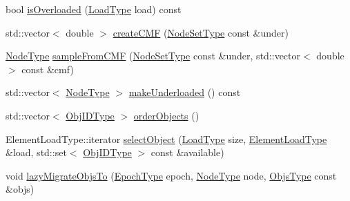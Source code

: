 \begin{DoxyCompactItemize}
\item 
bool \hyperlink{structvt_1_1vrt_1_1collection_1_1lb_1_1_gossip_l_b_a8bbe18748b6dd4b5269e6abfed5c6f99}{is\+Overloaded} (\hyperlink{structvt_1_1vrt_1_1collection_1_1lb_1_1_base_l_b_a215e22b9f12678303f49615ae3be05cc}{Load\+Type} load) const
\item 
std\+::vector$<$ double $>$ \hyperlink{structvt_1_1vrt_1_1collection_1_1lb_1_1_gossip_l_b_abde7527c3d55e4b9114ace8df4d7c0b9}{create\+C\+MF} (\hyperlink{structvt_1_1vrt_1_1collection_1_1lb_1_1_gossip_l_b_abb53f1d4bd3c37f3e68c3b5b0e1f1c86}{Node\+Set\+Type} const \&under)
\item 
\hyperlink{namespacevt_a866da9d0efc19c0a1ce79e9e492f47e2}{Node\+Type} \hyperlink{structvt_1_1vrt_1_1collection_1_1lb_1_1_gossip_l_b_a1a9e88510b1b61a181c9b4dcb3a8c153}{sample\+From\+C\+MF} (\hyperlink{structvt_1_1vrt_1_1collection_1_1lb_1_1_gossip_l_b_abb53f1d4bd3c37f3e68c3b5b0e1f1c86}{Node\+Set\+Type} const \&under, std\+::vector$<$ double $>$ const \&cmf)
\item 
std\+::vector$<$ \hyperlink{namespacevt_a866da9d0efc19c0a1ce79e9e492f47e2}{Node\+Type} $>$ \hyperlink{structvt_1_1vrt_1_1collection_1_1lb_1_1_gossip_l_b_a244326d030b7b9b82328d2ce617fef43}{make\+Underloaded} () const
\item 
std\+::vector$<$ \hyperlink{structvt_1_1vrt_1_1collection_1_1lb_1_1_base_l_b_a790b22acf448880599724749cdc4e9b3}{Obj\+I\+D\+Type} $>$ \hyperlink{structvt_1_1vrt_1_1collection_1_1lb_1_1_gossip_l_b_a82ff444a270a4b8f0bb9ff72e7244c58}{order\+Objects} ()
\item 
Element\+Load\+Type\+::iterator \hyperlink{structvt_1_1vrt_1_1collection_1_1lb_1_1_gossip_l_b_adafa0d7c3295e095149f48c3027b3173}{select\+Object} (\hyperlink{structvt_1_1vrt_1_1collection_1_1lb_1_1_base_l_b_a215e22b9f12678303f49615ae3be05cc}{Load\+Type} size, \hyperlink{structvt_1_1vrt_1_1collection_1_1lb_1_1_base_l_b_aa286d31a0820a8fc9218ccb858368fca}{Element\+Load\+Type} \&load, std\+::set$<$ \hyperlink{structvt_1_1vrt_1_1collection_1_1lb_1_1_base_l_b_a790b22acf448880599724749cdc4e9b3}{Obj\+I\+D\+Type} $>$ const \&available)
\item 
void \hyperlink{structvt_1_1vrt_1_1collection_1_1lb_1_1_gossip_l_b_a12cd87d3d0f4c186ffca1b554f5086dc}{lazy\+Migrate\+Objs\+To} (\hyperlink{namespacevt_a985a5adf291c34a3ca263b3378388236}{Epoch\+Type} epoch, \hyperlink{namespacevt_a866da9d0efc19c0a1ce79e9e492f47e2}{Node\+Type} node, \hyperlink{structvt_1_1vrt_1_1collection_1_1lb_1_1_gossip_l_b_ad2093cf08cc6af0f3deb4441e40c55a9}{Objs\+Type} const \&objs)
\item 

\end{DoxyCompactItemize}
